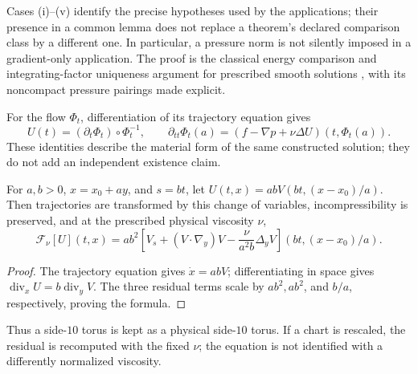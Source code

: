 Cases (i)--(v) identify the precise hypotheses used by the applications;
their presence in a common lemma does not replace a theorem's declared
comparison class by a different one. In particular, a pressure norm is not
silently imposed in a gradient-only application. The proof is the classical
energy comparison and integrating-factor uniqueness argument for prescribed smooth solutions \cite[Section~18]{Leray1934} \cite{Gronwall1919},
with its noncompact pressure pairings made explicit.

For the flow $\Phi_t$, differentiation of its trajectory equation gives
\[
 U(t)=(\partial_t\Phi_t)\circ\Phi_t^{-1},\qquad
 \partial_{tt}\Phi_t(a)=
 (f-\nabla p+\nu\Delta U)(t,\Phi_t(a)).
\]
These identities describe the material form of the same constructed solution;
they do not add an independent existence claim.

\begin{lemma}\label{lem:p2-chart}
For $a,b>0$, $x=x_0+ay$, and $s=bt$, let
$U(t,x)=abV(bt,(x-x_0)/a)$. Then trajectories are transformed by this change
of variables, incompressibility is preserved, and at the prescribed physical
viscosity $\nu$,
\[
 \mathcal F_\nu[U](t,x)=ab^2\left[
 V_s+(V\cdot\nabla_y)V-\frac{\nu}{a^2b}\Delta_yV
 \right](bt,(x-x_0)/a).
\]
\end{lemma}
\begin{proof}
The trajectory equation gives $\dot x=abV$; differentiating in space gives
$\operatorname{div}_xU=b\operatorname{div}_yV$. The three residual terms
scale by $ab^2,ab^2$, and $b/a$, respectively, proving the formula.
\end{proof}
Thus a side-$10$ torus is kept as a physical side-$10$ torus. If a chart
is rescaled, the residual is recomputed with the fixed $\nu$; the equation
is not identified with a differently normalized viscosity.

